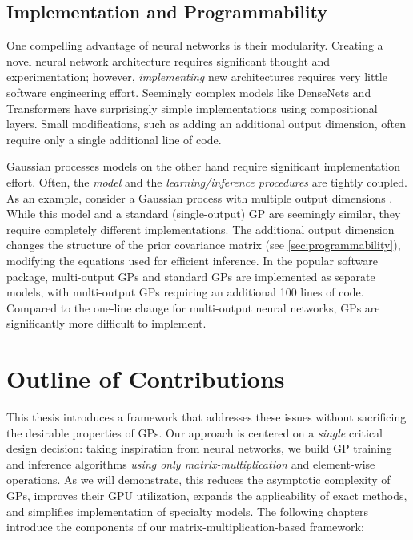 \subsection{Implementation and Programmability}
One compelling advantage of neural networks is their modularity.
Creating a novel neural network architecture requires significant thought and experimentation; however, \emph{implementing} new architectures requires very little software engineering effort.
Seemingly complex models like DenseNets \cite{huang2017densely} and Transformers \cite{vaswani2017attention} have surprisingly simple implementations using compositional layers.
Small modifications, such as adding an additional output dimension, often require only a single additional line of code.

Gaussian processes models on the other hand require significant implementation effort.
Often, the \emph{model} and the \emph{learning/inference procedures} are tightly coupled.
As an example, consider a Gaussian process with multiple output dimensions \cite{bonilla2008multi}.
While this model and a standard (single-output) GP are seemingly similar, they require completely different implementations.
The additional output dimension changes the structure of the prior covariance matrix (see \cref{sec:programmability}), modifying the equations used for efficient inference.
In the popular \citet{gpy2014} software package, multi-output GPs and standard GPs are implemented as separate models, with multi-output GPs requiring an additional 100 lines of code.
Compared to the one-line change for multi-output neural networks, GPs are significantly more difficult to implement.



\section{Outline of Contributions}
This thesis introduces a framework that addresses these issues without sacrificing the desirable properties of GPs.
Our approach is centered on a \emph{single} critical design decision:
taking inspiration from neural networks, we build GP training and inference algorithms \emph{using only matrix-multiplication} and element-wise operations.
As we will demonstrate, this reduces the asymptotic complexity of GPs, improves their GPU utilization, expands the applicability of exact methods, and simplifies implementation of specialty models.
The following chapters introduce the components of our matrix-multiplication-based framework:

